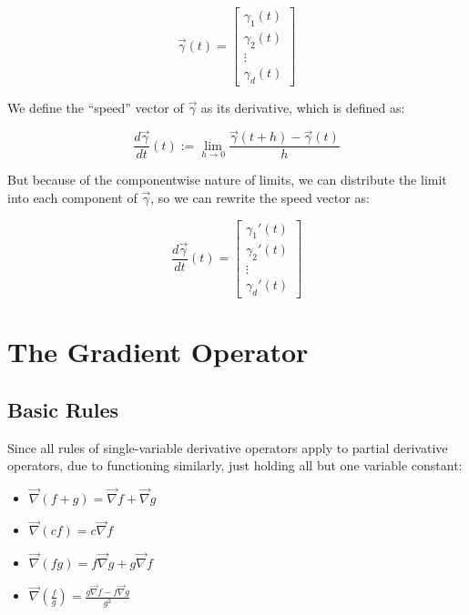 \documentclass[11 pt, twoside]{article}
\begin{document}
\begin{equation*}
    \vec{\gamma}(t) = \left[
    \begin{array}{c}
        \gamma_1 (t)\\
        \gamma_2 (t)\\
        \vdots\\
        \gamma_d (t)
    \end{array} \right]
\end{equation*}

We define the ``speed'' vector of $\vec{\gamma}$ as its derivative, which is
defined as:

$$\frac{d\vec{\gamma}}{dt}(t) := \lim_{h\to0} \frac{\vec{\gamma}(t + h) - \vec{\gamma}(t)}{h}$$

But because of the componentwise nature of limits, we can distribute the limit
into each component of $\vec{\gamma}$, so we can rewrite the speed vector as:

\begin{equation*}
    \frac{d\vec{\gamma}}{dt}(t) = \left[
    \begin{array}{c}
        \gamma_1' (t)\\
        \gamma_2' (t)\\
        \vdots\\
        \gamma_d' (t)
    \end{array} \right]
\end{equation*}

\section{The Gradient Operator}

\subsection{Basic Rules}

Since all rules of single-variable derivative operators apply to partial derivative operators, due to functioning similarly, just holding all but one variable constant:

\begin{itemize}
\item $\vec{\nabla}(f + g) = \vec{\nabla}f + \vec{\nabla}g$
\item $\vec{\nabla}(cf) = c\vec{\nabla}f$
\item $\vec{\nabla}(fg) = f\vec{\nabla}g + g\vec{\nabla}f$
\item $\vec{\nabla}(\frac{f}{g}) = \frac{g\vec{\nabla}f - f\vec{\nabla}g}{g^2}$
\end{itemize}
\end{document}
